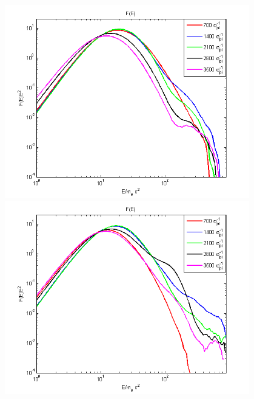\documentclass[a4paper]{jpconf}
\begin{document}
	
	\begin{figure}[h!]
		\centering
		\begin{minipage}{0.49\textwidth}
			\centering
			\includegraphics[width=0.95\textwidth]{fig/spectrum20.png} 
		\end{minipage}\hfill
		\begin{minipage}{0.49\textwidth}
			\centering
			\includegraphics[width=0.95\textwidth]{fig/spectrum30.png} 
		\end{minipage}
		\begin{minipage}{0.49\textwidth}
			\centering

\end{minipage}
\end{figure}
\end{document}

